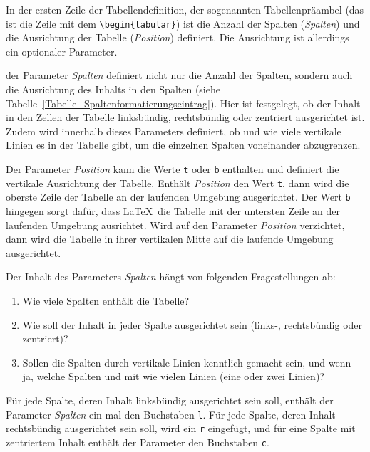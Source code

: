 \documentclass[a4paper,10pt,twoside]{scrbook}
\begin{document}
In der ersten Zeile der Tabellendefinition, 
der sogenannten Tabellenpräambel 
(das ist die Zeile mit 
dem \verb!\begin{tabular}!) ist die Anzahl der Spalten (\textsl{Spalten}) 
und die Ausrichtung der Tabelle (\textsl{Position}) 
definiert. Die Ausrichtung ist allerdings ein optionaler Parameter.

der Parameter \textsl{Spalten} definiert nicht nur die
Anzahl der Spalten, sondern auch die 
Ausrichtung des Inhalts in den Spalten (siehe 
Tabelle~\ref{Tabelle_Spaltenformatierungseintrag}).
Hier ist festgelegt, ob der Inhalt in den Zellen 
der Tabelle linksbündig, rechtsbündig oder 
zentriert ausgerichtet ist. Zudem wird innerhalb dieses Parameters
definiert, ob und wie viele vertikale Linien es in der Tabelle gibt,
um die einzelnen Spalten voneinander abzugrenzen.



Der Parameter \textsl{Position} 
kann die Werte \verb!t! oder \verb!b!
enthalten und definiert die vertikale 
Ausrichtung der Tabelle. 
Enthält \textsl{Position} den Wert 
\verb!t!, dann wird die oberste Zeile
der Tabelle an der laufenden Umgebung 
ausgerichtet. Der Wert \verb!b!
hingegen sorgt dafür, dass \LaTeX\ die Tabelle 
mit der untersten Zeile an der
laufenden Umgebung ausrichtet. 
Wird auf den Parameter \textsl{Position} 
verzichtet, dann wird die Tabelle in ihrer
vertikalen Mitte auf die laufende 
Umgebung ausgerichtet. 

Der Inhalt des Parameters \textsl{Spalten} hängt von 
folgenden Fragestellungen ab:

\begin{enumerate}
\item Wie viele Spalten enthält die Tabelle?
\item Wie soll der Inhalt in jeder Spalte ausgerichtet sein (links-,
rechtsbündig oder zentriert)?
\item Sollen die Spalten durch vertikale Linien kenntlich gemacht sein, und
wenn ja, welche Spalten und mit wie vielen Linien (eine oder zwei Linien)?
\end{enumerate}



Für jede Spalte, deren Inhalt 
linksbündig ausgerichtet sein soll,
enthält der Parameter \textsl{Spalten} ein mal den Buchstaben \verb!l!. 
Für jede Spalte, deren Inhalt rechtsbündig
ausgerichtet sein soll, wird ein \verb!r! eingefügt, und für eine Spalte
mit zentriertem Inhalt 
enthält der Parameter den Buchstaben \verb!c!.
\end{document}
